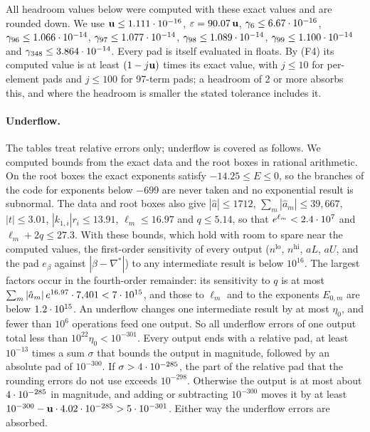 All headroom values below were computed with these exact values and are rounded down.
We use $\mathbf{u}\le1.111\cdot 10^{-16}$, $\varepsilon=90.07\,\mathbf{u}$, $\gamma_6\le6.67\cdot 10^{-16}$, $\gamma_{96}\le1.066\cdot 10^{-14}$, $\gamma_{97}\le1.077\cdot 10^{-14}$, $\gamma_{98}\le1.089\cdot 10^{-14}$, $\gamma_{99}\le1.100\cdot 10^{-14}$ and $\gamma_{348}\le3.864\cdot 10^{-14}$.
Every pad is itself evaluated in floats.
By (F4) its computed value is at least $(1-j\mathbf{u})$ times its exact value, with $j\le10$ for per-element pads and $j\le100$ for 97-term pads; a headroom of 2 or more absorbs this, and where the headroom is smaller the stated tolerance includes it.

\paragraph{Underflow.}
The tables treat relative errors only; underflow is covered as follows.
We computed bounds from the exact data and the root boxes in rational arithmetic.
On the root boxes the exact exponents satisfy $-14.25\le E\le0$, so the branches of the code for exponents below $-699$ are never taken and no exponential result is subnormal.
The data and root boxes also give $|\hat a|\le1712$, $\sum_m|\hat a_m|\le39{,}667$, $|t|\le3.01$, $|k_{1,i}|r_i\le13.91$, $\ell_m\le16.97$ and $q\le5.14$, so that $e^{\ell_m}<2.4\cdot 10^{7}$ and $\ell_m+2q\le27.3$.
With these bounds, which hold with room to spare near the computed values, the first-order sensitivity of every output ($n^{\mathrm{lo}}$, $n^{\mathrm{hi}}$, $aL$, $aU$, and the pad $e_\beta$ against $|\beta-\nabla^*|$) to any intermediate result is below $10^{16}$.
The largest factors occur in the fourth-order remainder: its sensitivity to $q$ is at most $\sum_m|\hat a_m|\,e^{16.97}\cdot7{,}401<7\cdot 10^{15}$, and those to $\ell_m$ and to the exponents $E_{0,m}$ are below $1.2\cdot 10^{15}$.
An underflow changes one intermediate result by at most $\eta_0$, and fewer than $10^6$ operations feed one output.
So all underflow errors of one output total less than $10^{22}\eta_0<10^{-301}$.
Every output ends with a relative pad, at least $10^{-13}$ times a sum $\sigma$ that bounds the output in magnitude, followed by an absolute pad of $10^{-300}$.
If $\sigma>4\cdot 10^{-285}$, the part of the relative pad that the rounding errors do not use exceeds $10^{-298}$.
Otherwise the output is at most about $4\cdot 10^{-285}$ in magnitude, and adding or subtracting $10^{-300}$ moves it by at least $10^{-300}-\mathbf{u}\cdot4.02\cdot 10^{-285}>5\cdot 10^{-301}$.
Either way the underflow errors are absorbed.

